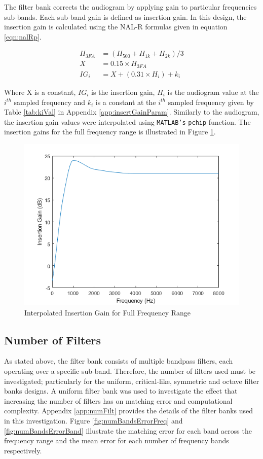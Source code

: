 \documentclass[12pt, onecolumn]{article}
\begin{document}
\noindent The filter bank corrects the audiogram by applying gain to particular frequencies sub-bands. Each sub-band gain is defined as insertion gain. In this design, the insertion gain is calculated using the NAL-R formulas given in equation \ref{eqn:nalRp}.

\begin{equation}
\label{eqn:nalRp}
\begin{aligned}
H_{3FA} &= (H_{500} + H_{1k} + H_{2k})/3 \\
X &= 0.15 \times H_{3FA} \\ 
IG_i &= X + (0.31\times H_i) + k_i
\end{aligned}
\end{equation}

\noindent Where X is a constant, $IG_i$ is the insertion gain, $H_i$ is the audiogram value at the $i^{th}$ sampled frequency and $k_i$ is a constant at the $i^{th}$ sampled frequency given by Table \ref{tab:kiVal} in Appendix \ref{app:insertGainParam}. Similarly to the audiogram, the insertion gain values were interpolated using \texttt{MATLAB's} \texttt{pchip} function. The insertion gains for the full frequency range is illustrated in Figure \ref{fig:igFreqRange}.

\begin{figure}[h]
\centering
\includegraphics[width=0.6\linewidth]{igFreqRange.PNG}
\caption{Interpolated Insertion Gain for Full Frequency Range}
\label{fig:igFreqRange}
\end{figure}  

\subsection{Number of Filters} 
\label{sec:numFreqBands}

\noindent As stated above, the filter bank consists of multiple bandpass filters, each operating over a specific sub-band. Therefore, the number of filters used must be investigated; particularly for the uniform, critical-like, symmetric and octave filter banks designs. A uniform filter bank was used to investigate the effect that increasing the number of filters has on matching error and computational complexity. Appendix \ref{app:numFilt} provides the details of the filter banks used in this investigation. Figure \ref{fig:numBandsErrorFreq} and \ref{fig:numBandsErrorBand} illustrate the matching error for each band across the frequency range and the mean error for each number of frequency bands respectively.
\end{document}
